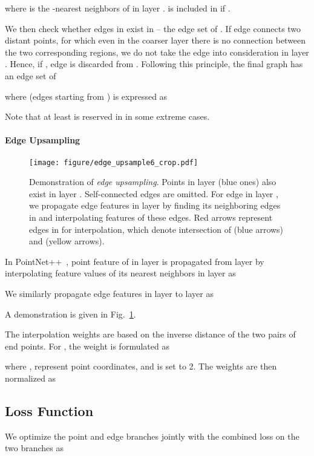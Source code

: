 \documentclass[10pt,twocolumn,letterpaper]{article}
\begin{document}
where  is the -nearest neighbors of  in layer .  is included in  if .

We then check whether edges in  exist in  -- the edge set of . If edge  connects two distant points, for which even in the coarser layer  there is no connection between the two corresponding regions, we do not take the edge into consideration in layer . Hence, if ,  edge  is discarded from . Following this principle, the final graph  has an edge set of

where  (edges starting from ) is expressed as

Note that at least  is reserved in  in some extreme cases.

\vspace{-0.12in}
\paragraph{Edge Upsampling}

\begin{figure}
	\begin{center}
		\texttt{[image: figure/edge\_upsample6\_crop.pdf]}
	\end{center}
	\caption{Demonstration of \textit{edge upsampling}. Points in layer  (blue ones) also exist in layer . Self-connected edges are omitted. For edge  in layer , we propagate edge features in layer  by finding its neighboring edges in  and interpolating features of these edges. Red arrows represent edges in  for interpolation, which denote intersection of  (blue arrows) and  (yellow arrows). } 
	\vspace{-3mm}
	\label{fig_edge_upsample}
\end{figure}

In PointNet++~\cite{pointnet2}, point feature of  in layer  is propagated from layer  by interpolating feature values of its  nearest neighbors in layer  as

We similarly propagate edge features in layer  to layer  as

A demonstration is given in Fig.~\ref{fig_edge_upsample}.

The interpolation weights are based on the inverse distance of the two pairs of end points. For , the weight is formulated as

where ,  represent point coordinates,  and  is set to 2. The weights are then normalized as


\subsection{Loss Function}
\label{sec_loss}
We optimize the point and edge branches jointly with the combined loss on the two branches as
\end{document}
